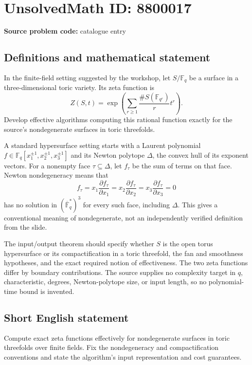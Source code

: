 \documentclass[11pt]{article}
\begin{document}
\section*{UnsolvedMath ID: 8800017}
\textbf{Source problem code:} catalogue entry
\subsection{Definitions and mathematical statement}
In the finite-field setting suggested by the workshop, let $S/\mathbb F_q$ be a surface in a three-dimensional toric variety. Its zeta function is
\[
Z(S,t)=\exp\left(\sum_{r\geq1}\frac{\#S(\mathbb F_{q^r})}{r}t^r\right).
\]
Develop effective algorithms computing this rational function exactly for the source's nondegenerate surfaces in toric threefolds.

A standard hypersurface setting starts with a Laurent polynomial $f\in\mathbb F_q[x_1^{\pm1},x_2^{\pm1},x_3^{\pm1}]$ and its Newton polytope $\Delta$, the convex hull of its exponent vectors. For a nonempty face $\tau\subseteq\Delta$, let $f_\tau$ be the sum of terms on that face. Newton nondegeneracy means that
\[
f_\tau=x_1\frac{\partial f_\tau}{\partial x_1}
=x_2\frac{\partial f_\tau}{\partial x_2}
=x_3\frac{\partial f_\tau}{\partial x_3}=0
\]
has no solution in $(\overline{\mathbb F}_q^*)^3$ for every such face, including $\Delta$. This gives a conventional meaning of nondegenerate, not an independently verified definition from the slide.

The input/output theorem should specify whether $S$ is the open torus hypersurface or its compactification in a toric threefold, the fan and smoothness hypotheses, and the exact required notion of effectiveness. The two zeta functions differ by boundary contributions. The source supplies no complexity target in $q$, characteristic, degrees, Newton-polytope size, or input length, so no polynomial-time bound is invented.
\subsection{Short English statement}
Compute exact zeta functions effectively for nondegenerate surfaces in toric threefolds over finite fields. Fix the nondegeneracy and compactification conventions and state the algorithm's input representation and cost guarantees.
\end{document}
